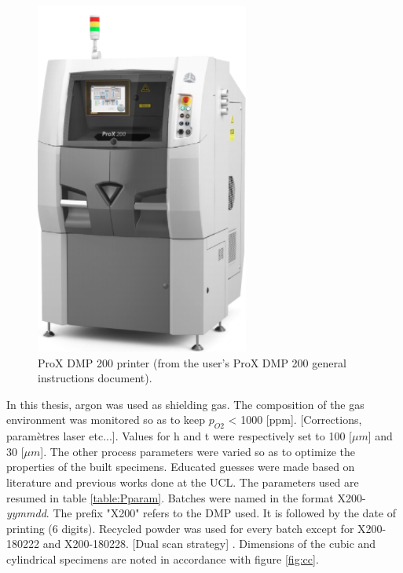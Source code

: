 \begin{figure}[th]
\centering
\includegraphics[scale=0.7]{Images/Printer}
\decoRule
\caption[ProX DMP 200 printer]{ProX DMP 200 printer (from the user's ProX DMP 200 general instructions document).}
\label{fig:Printer}
\end{figure}

In this thesis, argon was used as shielding gas. The composition of the gas environment was monitored so as to keep $p_{O2}$ < 1000 [ppm]. [Corrections, paramètres laser etc...]. Values for h and t were respectively set to 100 [$\mu m$] and 30 [$\mu m$]. The other process parameters were varied so as to optimize the properties of the built specimens. Educated guesses were made based on literature and previous works done at the UCL. The parameters used are resumed in table \ref{table:Pparam}. Batches were named in the format X200-\textit{yymmdd}. The prefix "X200" refers to the DMP used. It is followed by the date of printing (6 digits). Recycled powder was used for every batch except for X200-180222 and X200-180228. [Dual scan strategy] . Dimensions of the cubic and cylindrical specimens are noted in accordance with figure \ref{fig:cc}.\\

